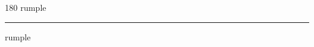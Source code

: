 
\begin{frame}
\begin{center}
\begin{turn}{180}
{\fontsize{2.5cm}{1em}\selectfont rumple}
\end{turn}
\vspace{1em}\par  
\hrule
\vspace{1em}\par  
{\fontsize{2.5cm}{1em}\selectfont rumple}
\end{center}
\end{frame}
